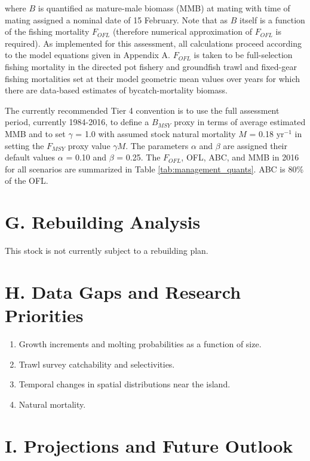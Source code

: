 \documentclass[]{article}
\providecommand{\tightlist}{%
  \setlength{\itemsep}{0pt}\setlength{\parskip}{0pt}}
\begin{document}
where \(B\) is quantified as mature-male biomass (MMB) at mating with
time of mating assigned a nominal date of 15 February. Note that as
\(B\) itself is a function of the fishing mortality \(F_\mathit{OFL}\)
(therefore numerical approximation of \(F_\mathit{OFL}\) is required).
As implemented for this assessment, all calculations proceed according
to the model equations given in Appendix A. \(F_\mathit{OFL}\) is taken
to be full-selection fishing mortality in the directed pot fishery and
groundfish trawl and fixed-gear fishing mortalities set at their model
geometric mean values over years for which there are data-based
estimates of bycatch-mortality biomass.

The currently recommended Tier 4 convention is to use the full
assessment period, currently 1984-2016, to define a \(B_\mathit{MSY}\)
proxy in terms of average estimated MMB and to set \(\gamma\) = 1.0 with
assumed stock natural mortality \(M\) = 0.18 \(\text{yr}^{-1}\) in
setting the \(F_\mathit{MSY}\) proxy value \(\gamma M\). The parameters
\(\alpha\) and \(\beta\) are assigned their default values \(\alpha\) =
0.10 and \(\beta\) = 0.25. The \(F_\mathit{OFL}\), OFL, ABC, and MMB in
2016 for all scenarios are summarized in Table
\ref{tab:management_quants}. ABC is 80\% of the OFL.

\section{G. Rebuilding Analysis}\label{g.-rebuilding-analysis}

This stock is not currently subject to a rebuilding plan.

\section{H. Data Gaps and Research
Priorities}\label{h.-data-gaps-and-research-priorities}

\begin{enumerate}
\def\labelenumi{\arabic{enumi}.}
\tightlist
\item
  Growth increments and molting probabilities as a function of size.
\item
  Trawl survey catchability and selectivities.
\item
  Temporal changes in spatial distributions near the island.
\item
  Natural mortality.
\end{enumerate}

\section{I. Projections and Future
Outlook}\label{i.-projections-and-future-outlook}
\end{document}

